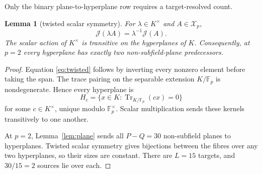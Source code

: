 \documentclass[a4paper,10pt]{amsart}
\newtheorem{lemma}[theorem]{Lemma}
\theoremstyle{remark}
\newcommand{\F}{\mathbb F}
\newcommand{\K}{K}
\newcommand{\X}{\mathcal X}
\newcommand{\J}{\mathcal J}
\newcommand{\Tr}{\operatorname{Tr}}
\begin{document}
Only the binary plane-to-hyperplane row requires a target-resolved count.

\begin{lemma}[twisted scalar symmetry]\label{lem:singer}
For $\lambda\in\K^\times$ and $A\in\X_p$,
\begin{equation}\label{eq:twisted}
 \J(\lambda A)=\lambda^{-1}\J(A).
\end{equation}
The scalar action of $\K^\times$ is transitive on the hyperplanes of $\K$.
Consequently, at $p=2$ every hyperplane has exactly two non-subfield-plane
predecessors.
\end{lemma}

\begin{proof}
Equation \eqref{eq:twisted} follows by inverting every nonzero element before
taking the span.  The trace pairing on the separable extension
$\K/\F_p$ is nondegenerate.  Hence every hyperplane is
\[
 H_c=\{x\in\K:\Tr_{\K/\F_p}(cx)=0\}
\]
for some $c\in\K^\times$, unique modulo $\F_p^\times$.  Scalar
multiplication sends these kernels transitively to one another.

At $p=2$, Lemma~\ref{lem:plane} sends all $P-Q=30$ non-subfield planes to
hyperplanes.  Twisted scalar symmetry gives bijections between the fibres
over any two hyperplanes, so their sizes are constant.  There are $L=15$
targets, and $30/15=2$ sources lie over each.
\end{proof}
\end{document}

